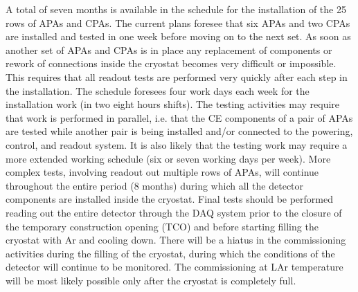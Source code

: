 A total of seven months is available in the schedule for the installation
of the 25 rows of APAs and CPAs. The current plans foresee that six APAs and two CPAs are installed and
tested in one week before moving on to the next set. As soon as another
set of APAs and CPAs is in place any replacement of components or rework
of connections inside the cryostat becomes very difficult or impossible.
This requires that all readout tests are performed very quickly after
each step in the installation. The schedule foresees four work days each
week for the installation work (in two eight hours shifts). The testing
activities may require that work is performed in parallel, i.e. that
the CE components of a pair of APAs are tested while another pair is
being installed and/or connected to the powering, control, and readout
system. It is also likely that the testing work may require a more
extended working schedule (six or seven working days per week). More
complex tests, involving readout out multiple rows of APAs, will continue
throughout the entire period (8 months) during which all the detector
components are installed inside the cryostat. Final tests should be
performed reading out the entire detector through the DAQ system
prior to the closure of the temporary construction opening (TCO) and before
starting filling the cryostat with Ar and cooling down. There will be a hiatus
in the commissioning activities during the filling of the cryostat, during
which the conditions of the detector will continue to be monitored. The
commissioning at LAr temperature will be most likely possible only
after the cryostat is completely full.

